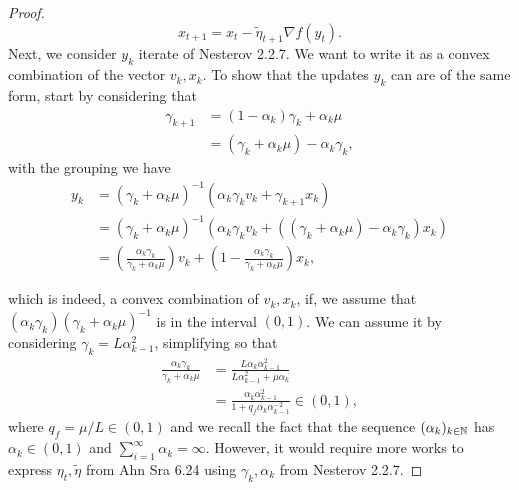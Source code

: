 \begin{proof}
            $$
                x_{t + 1} = x_t - \tilde \eta_{t + 1}\nabla f(y_t). 
            $$
            Next, we consider $y_{k}$ iterate of Nesterov 2.2.7. 
            We want to write it as a convex combination of the vector $v_k,x_k$. 
            To show that the updates $y_k$ can are of the same form, start by considering that 
            \begin{align*}
                \gamma_{k + 1 } &= (1 - \alpha_k)\gamma_k + \alpha_k \mu
                \\
                &= (\gamma_k + \alpha_k \mu) - \alpha_k \gamma_k, 
            \end{align*}
            with the grouping we have
            \begin{align*}
                y_k &= \left(
                    \gamma_k + \alpha_k \mu
                    \right)^{-1} \left(
                        \alpha_k \gamma_k v_k + \gamma_{k + 1}x_k
                    \right)
                \\
                &= 
                \left(
                    \gamma_k + \alpha_k \mu
                \right)^{-1}
                \left(
                    \alpha_k \gamma_k v_k 
                    + 
                    ((\gamma_k + \alpha_k\mu) - \alpha_k\gamma_k)x_k
                \right)
                \\
                &= 
                \left(
                    \frac{\alpha_k \gamma_k}{\gamma_k + \alpha_k \mu}
                \right)v_k
                + 
                \left(
                    1 - \frac{\alpha_k\gamma_k }{\gamma_k + \alpha_k \mu}
                \right)x_k, 
            \end{align*}

            which is indeed, a convex combination of $v_k, x_k$, if, we assume that $(\alpha_k\gamma_k)(\gamma_k + \alpha_k \mu)^{-1}$ is in the interval $(0, 1)$. 
            We can assume it by considering $\gamma_k = L\alpha_{k-1}^2$, simplifying so that 
            \begin{align*}
                \frac{\alpha_k \gamma_k}{\gamma_k + \alpha_k \mu}
                &= 
                \frac{L\alpha_k \alpha_{k - 1}^2}{L\alpha_{k - 1}^2 + \mu \alpha_k}
                \\
                &= \frac{\alpha_k \alpha_{k - 1}^2}{1 + q_f \alpha_k \alpha_{k - 1}^{-2}} \in (0, 1), 
            \end{align*}
            where $q_f = \mu / L \in (0, 1)$ and we recall the fact that the sequence $(\alpha_k)_{k \in \mathbb N}$ has $\alpha_k \in (0, 1)$ and $\sum_{i = 1}^{\infty} \alpha_k = \infty$. 
            However, it would require more works to express $\eta_t, \tilde\eta$ from Ahn Sra 6.24 using $\gamma_k, \alpha_k$ from Nesterov 2.2.7. 
        \end{proof}

